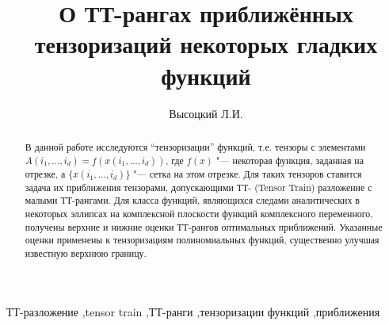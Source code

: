 \documentclass[3p]{cmmp}%
\numberwithin{equation}{section}
\begin{document}
\begin{frontmatter}

\title{О ТТ-рангах приближённых тензоризаций некоторых гладких функций}

\author[inm,cmcmsu]{Высоцкий Л.И.}%

\address[inm]{Институт вычислительной математики им. Г.И. Марчука
Российской академии наук, ул. Губкина, 8, Москва, Россия, 119333}
\address[cmcmsu]{Факультет вычислительной математики и кибернетики,
Московский государственный университет имени М.В. Ломоносова,
Ленинские горы, 1, стр.52, ГСП-1, Москва, Россия, 119991}

\begin{abstract}
В данной работе исследуются ``тензоризации'' функций, т.е. тензоры с элементами $A(i_1, \dots, i_d) = f(x(i_1, \dots, i_d))$, где $f(x)$ "--- некоторая функция, заданная на отрезке, а $\{x(i_1, \dots, i_d)\}$ "--- сетка на этом отрезке.
Для таких тензоров ставится задача их приближения тензорами, допускающими ТТ- (Tensor Train) разложение с малыми ТТ-рангами.
Для класса функций, являющихся следами аналитических в некоторых эллипсах на комплексной плоскости функций комплексного переменного, получены верхние и нижние оценки ТТ-рангов оптимальных приближений.
Указанные оценки применены к тензоризациям полиномиальных функций, существенно улучшая известную верхнюю границу.
\end{abstract}
\begin{keyword}
ТТ-разложение \sep tensor train \sep ТТ-ранги \sep тензоризации функций
\sep приближения
\end{keyword}
\end{frontmatter}

%



\end{document}
